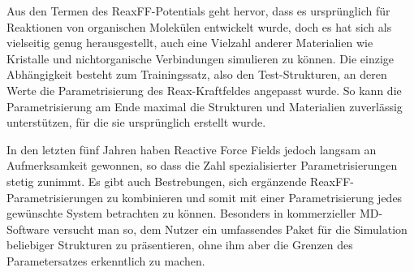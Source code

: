 Aus den Termen des ReaxFF-Potentials geht hervor, dass es ursprünglich für Reaktionen von organischen Molekülen entwickelt wurde, doch es hat sich als vielseitig genug herausgestellt, auch eine Vielzahl anderer Materialien wie Kristalle und nichtorganische Verbindungen simulieren zu können.
Die einzige Abhängigkeit besteht zum Trainingssatz, also den Test-Strukturen, an deren Werte die Parametrisierung des Reax-Kraftfeldes angepasst wurde.
So kann die Parametrisierung am Ende maximal die Strukturen und Materialien zuverlässig unterstützen, für die sie ursprünglich erstellt wurde.

In den letzten fünf Jahren haben Reactive Force Fields jedoch langsam an Aufmerksamkeit gewonnen, so dass die Zahl spezialisierter Parametrisierungen stetig zunimmt.
Es gibt auch Bestrebungen, sich ergänzende ReaxFF-Parametrisierungen zu kombinieren und somit mit einer Parametrisierung jedes gewünschte System betrachten zu können.
Besonders in kommerzieller MD-Software versucht man so, dem Nutzer ein umfassendes Paket für die Simulation beliebiger Strukturen zu präsentieren, ohne ihm aber die Grenzen des Parametersatzes erkenntlich zu machen.
